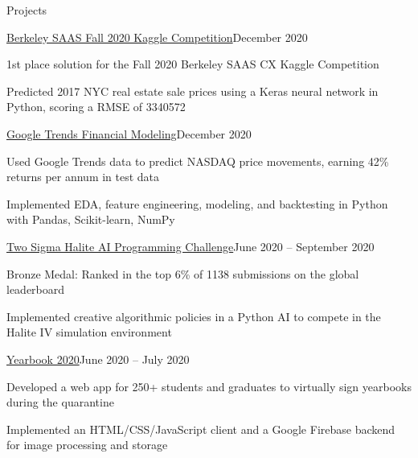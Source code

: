 \documentclass{resume} %
\begin{document}
\begin{rSection}{Projects}

\begin{rSubsection}{\href{https://www.kaggle.com/c/saas-2020-fall-cx-kaggle-compeition/}{Berkeley SAAS Fall 2020 Kaggle Competition}}{December 2020}{}{}
    \item 1st place solution for the Fall 2020 Berkeley SAAS CX Kaggle Competition
    \item Predicted 2017 NYC real estate sale prices using a Keras neural network in Python, scoring a RMSE of 3340572
\end{rSubsection}

\begin{rSubsection}{\href{https://github.com/evilpegasus/google-trends-financial-modeling/}{Google Trends Financial Modeling}}{December 2020}{}{}
    \item Used Google Trends data to predict NASDAQ price movements, earning 42\% returns per annum in test data
    \item Implemented EDA, feature engineering, modeling, and backtesting in Python with Pandas, Scikit-learn, NumPy
\end{rSubsection}

\begin{rSubsection}{\href{https://www.kaggle.com/c/halite/}{Two Sigma Halite AI Programming Challenge}}{June 2020 – September 2020}{}{}
    \item Bronze Medal: Ranked in the top 6\% of 1138 submissions on the global leaderboard
    \item Implemented creative algorithmic policies in a Python AI to compete in the Halite IV simulation environment
\end{rSubsection}

\begin{rSubsection}{\href{https://yearbook-hhs.web.app/}{Yearbook 2020}}{June 2020 – July 2020}{}{}
    \item Developed a web app for 250+ students and graduates to virtually sign yearbooks during the quarantine
    \item Implemented an HTML/CSS/JavaScript client and a Google Firebase backend for image processing and storage
\end{rSubsection}

\end{rSection}

\end{document}
